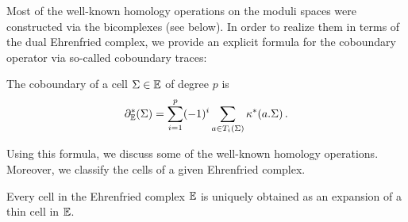 Most of the well-known homology operations on the moduli spaces were constructed via the bicomplexes (see below).
In order to realize them in terms of the dual Ehrenfried complex, we provide an explicit formula for the coboundary operator via so-called coboundary traces:
\begin{prop*}[B., H.]
    The coboundary of a cell $\Sigma \in \mathbb E$ of degree $p$ is
    \[
        \partial_\mathbb E^\ast(\Sigma) = \sum_{i=1}^p (-1)^i \sum_{a \in T_i(\Sigma)} \kappa^\ast( a.\Sigma ) \,.
    \]
\end{prop*}

Using this formula, we discuss some of the well-known homology operations.
Moreover, we classify the cells of a given Ehrenfried complex.
\begin{prop*}[B., H.]
    Every cell in the Ehrenfried complex $\mathbb E$ is uniquely obtained as an expansion of a thin cell in $\mathbb E$.
\end{prop*}


